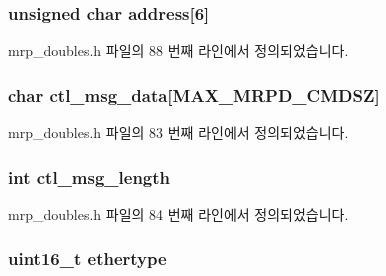 \subsubsection[{\texorpdfstring{address}{address}}]{\setlength{\rightskip}{0pt plus 5cm}unsigned char address\mbox{[}6\mbox{]}}\hypertarget{structmrpd__test__state_aa70c068e41ae99fa44d0b66209237075}{}\label{structmrpd__test__state_aa70c068e41ae99fa44d0b66209237075}


mrp\+\_\+doubles.\+h 파일의 88 번째 라인에서 정의되었습니다.

\subsubsection[{\texorpdfstring{ctl\+\_\+msg\+\_\+data}{ctl_msg_data}}]{\setlength{\rightskip}{0pt plus 5cm}char ctl\+\_\+msg\+\_\+data\mbox{[}{\bf M\+A\+X\+\_\+\+M\+R\+P\+D\+\_\+\+C\+M\+D\+SZ}\mbox{]}}\hypertarget{structmrpd__test__state_a167ca5a6f26ada0b2865b4dd489753d2}{}\label{structmrpd__test__state_a167ca5a6f26ada0b2865b4dd489753d2}


mrp\+\_\+doubles.\+h 파일의 83 번째 라인에서 정의되었습니다.

\subsubsection[{\texorpdfstring{ctl\+\_\+msg\+\_\+length}{ctl_msg_length}}]{\setlength{\rightskip}{0pt plus 5cm}int ctl\+\_\+msg\+\_\+length}\hypertarget{structmrpd__test__state_ae02cd1c7ca02ce1d99e22972db6565a9}{}\label{structmrpd__test__state_ae02cd1c7ca02ce1d99e22972db6565a9}


mrp\+\_\+doubles.\+h 파일의 84 번째 라인에서 정의되었습니다.

\subsubsection[{\texorpdfstring{ethertype}{ethertype}}]{\setlength{\rightskip}{0pt plus 5cm}uint16\+\_\+t ethertype}\hypertarget{structmrpd__test__state_aa9296c58dc24c63c4ee927db394a97d7}{}\label{structmrpd__test__state_aa9296c58dc24c63c4ee927db394a97d7}


